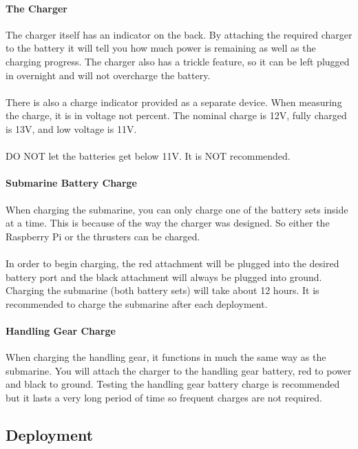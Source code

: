 \documentclass[
10pt, %
a4paper, %
oneside, %
headinclude,footinclude, %
BCOR5mm, %
]{scrartcl}
\begin{document}
\paragraph{The Charger}
The charger itself has an indicator on the back. By attaching the required charger to the battery it will tell you how much power is remaining as well as the charging progress. The charger also has a trickle feature, so it can be left plugged in overnight and will not overcharge the battery.\\ \\
There is also a charge indicator provided as a separate device. When measuring the charge, it is in voltage not percent. The nominal charge is 12V, fully charged is 13V, and low voltage is 11V. \\ \\
DO NOT let the batteries get below 11V. It is NOT recommended.

\paragraph{Submarine Battery Charge}
When charging the submarine, you can only charge one of the battery sets inside at a time. This is because of the way the charger was designed. So either the Raspberry Pi or the thrusters can be charged. \\ \\
In order to begin charging, the red attachment will be plugged into the desired battery port and the black attachment will always be plugged into ground. Charging the submarine (both battery sets) will take about 12 hours. It is recommended to charge the submarine after each deployment.

\paragraph{Handling Gear Charge}
When charging the handling gear, it functions in much the same way as the submarine. You will attach the charger to the handling gear battery, red to power and black to ground. Testing the handling gear battery charge is recommended but it lasts a very long period of time so frequent charges are not required.


\subsection{Deployment}
\end{document}
